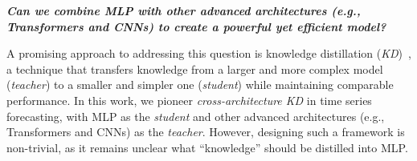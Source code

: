 \begin{center}
\vspace{-0.7em}
\begin{tcolorbox}[colback=yellow!10!white, colframe=yellow!75!black, width=0.45\textwidth, boxrule=0.5mm, arc=5mm, auto outer arc]
\centering
\textit{\textbf{Can we combine MLP with other advanced architectures (e.g., Transformers and CNNs) to create a powerful yet efficient model?}}
\end{tcolorbox}
\vspace{-0.7em}
\end{center}

A promising approach to addressing this question is knowledge distillation (\textit{KD})~\cite{hinton2015distilling}, a technique that transfers knowledge from a larger and more complex model (\textit{teacher}) to a smaller and simpler one (\textit{student}) while maintaining comparable performance. In this work, we pioneer \textit{cross-architecture KD} in time series forecasting, with MLP as the \textit{student} and other advanced architectures (e.g., Transformers and CNNs) as the \textit{teacher}. However, designing such a framework is non-trivial, as it remains unclear what ``knowledge'' should be distilled into MLP.


